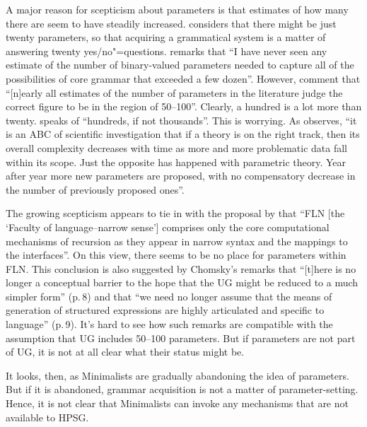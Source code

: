 \documentclass[output=paper
	        ,collection
	        ,collectionchapter
 	        ,biblatex
                ,babelshorthands
                ,newtxmath
                ,draftmode
                ,colorlinks, citecolor=brown
]{langscibook}
\begin{document}
A major reason for scepticism about parameters is that estimates of how many there are seem to have
steadily increased. \citet[]{Fodor2001b} considers that there might be just twenty parameters, so that
acquiring a grammatical system is a matter of answering twenty yes/no"=questions. \citet[]{Newmeyer2005a} remarks that ``I have never seen any estimate of the number of binary-valued
parameters needed to capture all of the possibilities of core grammar that exceeded a few
dozen''. However, \citet{RH2005a} comment that ``[n]early all estimates of the number of
parameters in the literature judge the correct figure to be in the region of 50--100''. Clearly, a
hundred is a lot more than twenty. \citet[Section~6.3]{Newmeyer2017a} speaks of ``hundreds, if not thousands''.
This is worrying. As \citet[]{Newmeyer2006a-u} observes, ``it
is an ABC of scientific investigation that if a theory is on the right track, then its overall
complexity decreases with time as more and more problematic data fall within its scope. Just the
opposite has happened with parametric theory. Year after year more new parameters are proposed, with
no compensatory decrease in the number of previously proposed ones''.

The growing scepticism appears to tie in with the proposal by \citet*[]{HCF2002a}
that ``FLN [the `Faculty of language--narrow sense'] comprises only the core computational mechanisms of
recursion as they appear in narrow syntax and the mappings to the interfaces''. On this view, there
seems to be no place for parameters within FLN. This conclusion is also suggested by Chomsky’s
remarks \citeyearpar{Chomsky2005a} that ``[t]here is no longer a conceptual barrier to the hope that the UG
might be reduced to a much simpler form'' (p.\,8) and that ``we need no longer assume that
the means of generation of structured expressions are highly articulated and specific to language''
(p.\,9). It’s hard to see how such remarks are compatible with the assumption that UG includes 50--100
parameters. But if parameters are not part of UG, it is not at all clear what their status might be.

It looks, then, as Minimalists are gradually abandoning the idea of parameters. But if it is
abandoned, grammar acquisition is not a matter of parameter-setting. Hence, it is not clear that
Minimalists can invoke any mechanisms that are not available to HPSG.
\end{document}
